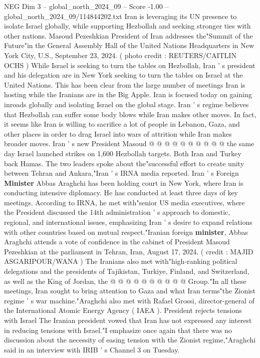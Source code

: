 \begin{textsample}{NEG Dim 3 – global\_north\_2024\_09 – Score -1.00 – global\_north\_2024\_09/114844202.txt}  \label{ex:f3_neg_297}
Iran is leveraging its UN presence to isolate Israel globally, while supporting Hezbollah and seeking stronger ties with other nations.
Masoud Pezeshkian President of Iran addresses the"Summit of the Future"in the General Assembly Hall of the United Nations Headquarters in New York City, U.S., September 23, 2024. ( photo credit : REUTERS/CAITLIN OCHS ) While Israel is seeking to turn the tables on Hezbollah, Iran ' s president and his delegation are in New York seeking to turn the tables on Israel at the United Nations.
This has been clear from the large number of meetings Iran is hosting while the Iranians are in the Big Apple.
Iran is focused today on gaining inroads globally and isolating Israel on the global stage.
Iran ' s regime believes that Hezbollah can suffer some body blows while Iran makes other moves.
In fact, it seems like Iran is willing to sacrifice a lot of people in Lebanon, Gaza, and other places in order to drag Israel into wars of attrition while Iran makes broader moves.
Iran ' s new President Masoud @ @ @ @ @ @ @ @ @ @ the same day Israel launched strikes on 1,600 Hezbollah targets.
Both Iran and Turkey back Hamas.
The two leaders spoke about the"successful effort to create unity between Tehran and Ankara,"Iran ' s IRNA media reported.
Iran ' s Foreign \textbf{Minister} Abbas Araghchi has been holding court in New York, where Iran is conducting intensive diplomacy.
He has conducted at least three days of key meetings.
According to IRNA, he met with"senior US media executives, where the President discussed the 14th administration ' s approach to domestic, regional, and international issues, emphasizing Iran ' s desire to expand relations with other countries based on mutual respect."Iranian foreign \textbf{minister}, Abbas Araghchi attends a vote of confidence in the cabinet of President Masoud Pezeshkian at the parliament in Tehran, Iran, August 17, 2024. ( credit : MAJID ASGARIPOUR/WANA ) The Iranians also met with"high-ranking political delegations and the presidents of Tajikistan, Turkiye, Finland, and Switzerland, as well as the King of Jordan, the @ @ @ @ @ @ @ @ @ @ Group."In all these meetings, Iran sought to bring attention to Gaza and what Iran terms"the Zionist regime ' s war machine."Araghchi also met with Rafael Grossi, director-general of the International Atomic Energy Agency ( IAEA ).
President rejects tensions with Israel The Iranian president vowed that Iran has not expressed any interest in reducing tensions with Israel."I emphasize once again that there was no discussion about the necessity of easing tension with the Zionist regime,"Araghchi said in an interview with IRIB ' s Channel 3 on Tuesday.

\end{textsample}
